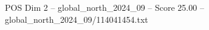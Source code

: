 \begin{textsample}{POS Dim 2 – global\_north\_2024\_09 – Score 25.00 – global\_north\_2024\_09/114041454.txt}
\end{textsample}
